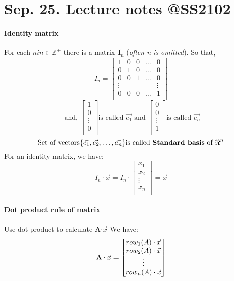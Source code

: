 \documentclass{article}
\begin{document}
	\section{Sep. 25. Lecture notes @SS2102}
	\paragraph{Identity matrix}For each $n in \in \mathbb{Z}^+$ there is a matrix $\textbf{I}_n$ (\emph{often n is omitted}). So that,
	\[
	I_n = 
	\begin{bmatrix}
		1 & 0 & 0 & \dots & 0\\
		0 & 1 & 0 & \dots & 0 \\
		0 & 0 & 1 & \dots & 0 \\
		\vdots & & & & \vdots \\
		0 & 0 & 0 & \dots & 1 \\
	\end{bmatrix}
	\]
	\[
	\text{ and, }
	\begin{bmatrix}
		1 \\
		0 \\
		\vdots \\
		0 \\	
	\end{bmatrix}
	\text{is called } \vec{e_1}
	\text{ and }
	\begin{bmatrix}
		0 \\
		0 \\
		\vdots \\
		1 \\	
	\end{bmatrix} \text{is called }\vec{e_n}
	\]
	\[
	\text{Set of vectors} \{\vec{e_1},\vec{e_2},\dots,\vec{e_n}\} \text{is called \textbf{Standard basis} of } \Re^n
	\]
	\newline For an identity matrix, we have:
	\[
	I_n \cdot \vec{x} = 
	I_n \cdot 
	\begin{bmatrix}
		x_1 \\
		x_2 \\
		\vdots \\
		x_n \\
	\end{bmatrix}
	=\vec{x}
	\]
	\paragraph{Dot product rule of matrix} Use dot product to calculate \textbf{A}$\cdot \vec{x}$ We have:
	\[
	\text{\textbf{A}} \cdot \vec{x}
	= 
	\begin{bmatrix}
		row_1(A) \cdot \vec{x} \\
		row_2(A) \cdot \vec{x} \\
		\vdots \\
		row_n(A) \cdot \vec{x} \\	
	\end{bmatrix}
	\]
\end{document}
